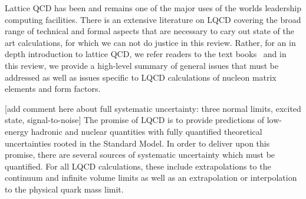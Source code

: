 Lattice QCD has been and remains one of the major uses of the worlds leadership computing facilities.
There is an extensive literature on LQCD covering the broad range of technical and formal aspects that are necessary to cary out state of the art calculations, for which we can not do justice in this review.
Rather, for an in depth introduction to lattice QCD, we refer readers to the text books~\cite{Smit:2002ug,DeGrand:2006zz,Gattringer:2010zz} and in this review, we provide a high-level summary of general issues that must be addressed as well as issues specific to LQCD calculations of nucleon matrix elements and form factors.



{\color{red}[add comment here about full systematic uncertainty: three normal limits, excited state, signal-to-noise]}
The promise of LQCD is to provide predictions of low-energy hadronic and nuclear quantities with fully quantified theoretical uncertainties rooted in the Standard Model.
In order to deliver upon this promise, there are several sources of systematic uncertainty which must be quantified.
For all LQCD calculations, these include extrapolations to the continuum and infinite volume limits as well as an extrapolation or interpolation to the physical quark mass limit.

